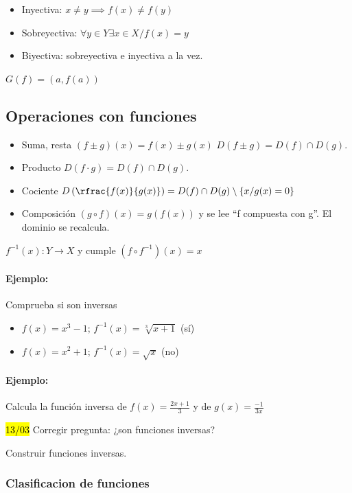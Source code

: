 \documentclass[palatino,nosec]{Docencia}
\begin{document}
\begin{itemize}
	\item Inyectiva: $x\neq y \implies f(x) \neq f(y)  $
	\item Sobreyectiva: $\forall y\in Y \exists x\in X / f(x) = y$
	\item Biyectiva: sobreyectiva e inyectiva a la vez.
\end{itemize}

 $G(f) = {\left(a,f(a)\right)}$

\subsection{Operaciones con funciones}
\begin{itemize}
	\item Suma, resta $(f\pm g)(x) = f(x) \pm g(x)$
	\subitem $D(f\pm g) = D(f)\cap D(g)$.
	\item Producto
	\subitem $D(f·g) = D(f)\cap D(g)$.
	\item Cociente 
	\subitem $D\left(\rfrac{f(x)}{g(x)}\right) = D(f)\cap D(g) \setminus \{x/g(x) = 0\}$
	\item Composición $(g\circ f)(x) = g\left(f(x)\right)$ y se lee ``f compuesta con g''.
	\subitem El dominio se recalcula.
\end{itemize}

 $f^{-1}(x):Y\to X$ y cumple $(f\circ f^{-1})(x) = x$

\paragraph{Ejemplo:} Comprueba si son inversas
\begin{itemize}
	\item $f(x) = x^3-1$; $f^{-1}(x) = \sqrt[3]{x+1}$ (sí)
	\item $f(x) = x^2+1$; $f^{-1}(x) = \sqrt{x}$ (no)
\end{itemize}

\paragraph{Ejemplo:} Calcula la función inversa de $f(x) = \frac{2x+1}{3}$ y de $g(x) = \frac{-1}{3x}$ 

\hl{13/03} Corregir pregunta: ¿son funciones inversas?

Construir funciones inversas.

\subsubsection{Clasificacion de funciones}
\end{document}
